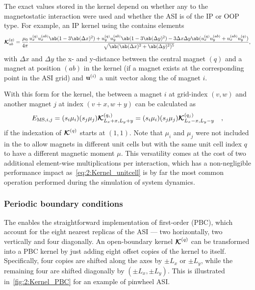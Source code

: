 The exact values stored in the kernel depend on whether any  to the magnetostatic interaction were used and whether the ASI is of the IP or OOP type.
For example, an IP kernel using the  contains elements
\begin{equation}
	\label{eq:2:Kernel_detailed}
	\vc{\mathcal{K}}^{(q)}_{ab} = \frac{\mu_0}{4 \pi} \frac{
		u_x^{(q)} u_x^{(ab)} \ab(1 - 3 \ab(\Delta x)^2) + u_y^{(q)} u_y^{(ab)} \ab(1 - 3 \ab(\Delta y)^2) - 3\Delta x \Delta y \ab(u_x^{(q)} u_y^{(ab)} + u_x^{(ab)} u_y^{(q)})
	}{
		\sqrt{\ab(\ab(\Delta x)^2 + \ab(\Delta y)^2)^5}
	} \mathrm{,}
\end{equation}
with $\Delta x$ and $\Delta y$ the x- and y-distance between the central magnet $(q)$ and a magnet at position $(ab)$ in the kernel (if a magnet exists at the corresponding point in the ASI grid) and $\boldsymbol{\mathbf{u}}^{(i)}$ a unit vector along the  of magnet $i$. \par
With this form for the kernel, the  between a magnet $i$ at grid-index $(v,w)$ and another magnet $j$ at index $(v+x, w+y)$ can be calculated as
\begin{equation}
	\label{eq:2:Kernel_unitcell}
	E_{\mathrm{MS},i,j} = (s_i \mu_i) (s_j \mu_j) \boldsymbol{\mathbf{\mathcal{K}}}^{(q_i)}_{L_x+x, L_y+y} = (s_i \mu_i) (s_j \mu_j) \boldsymbol{\mathbf{\mathcal{K}}}^{(q_j)}_{L_x-x, L_y-y} \quad \mathrm{,}
\end{equation}
if the indexation of $\boldsymbol{\mathbf{\mathcal{K}}}^{(q)}$ starts at $(1,1)$.
Note that $\mu_i$ and $\mu_j$ were not included in the  to allow magnets in different unit cells but with the same unit cell index $q$ to have a different magnetic moment $\mu$.
This versatility comes at the cost of two additional element-wise multiplications per interaction, which has a non-negligible performance impact as~\cref{eq:2:Kernel_unitcell} is by far the most common operation performed during the simulation of system dynamics. \\\par

\subsubsection{Periodic boundary conditions}\label{sec:2:Kernels:PBC}
The  enables the straightforward implementation of first-order  (PBC), which account for the eight nearest replicas of the ASI --- two horizontally, two vertically and four diagonally.
An open-boundary kernel $\boldsymbol{\mathbf{\mathcal{K}}}^{(q)}$ can be transformed into a PBC kernel by just adding eight offset copies of the kernel to itself.
Specifically, four copies are shifted along the axes by $\pm L_x$ or $\pm L_y$, while the remaining four are shifted diagonally by $(\pm L_x, \pm L_y)$.
This is illustrated in~\cref{fig:2:Kernel_PBC} for an example of pinwheel ASI. \par

